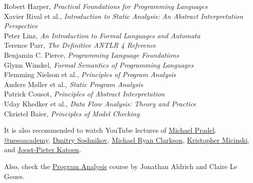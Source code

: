 \documentclass[nobrand,anonymous,nodate,nosecurity]{huawei}
\begin{document}
\begin{multicols}{2}\small\raggedright
{Robert Harper}, \emph{Practical Foundations for Programming Languages}\\[3pt]
{Xavier Rival et al.}, \emph{Introduction to Static Analysis: An Abstract Interpretation Perspective}\\[3pt]
{Peter Linz}, \emph{An Introduction to Formal Languages and Automata}\\[3pt]
{Terence Parr}, \emph{The Definitive ANTLR 4 Reference}\\[3pt]
{Benjamin C. Pierce}, \emph{Programming Language Foundations}\\[3pt]
{Glynn Winskel}, \emph{Formal Semantics of Programming Languages}\\[3pt]
{Flemming Nielson et al.}, \emph{Principles of Program Analysis}\\[3pt]
{Anders Møller et al.}, \emph{Static Program Analysis}\\[3pt]
{Patrick Cousot}, \emph{Principles of Abstract Interpretation}\\[3pt]
{Uday Khedker et al.}, \emph{Data Flow Analysis: Theory and Practice}\\[3pt]
{Christel Baier}, \emph{Principles of Model Checking}
\end{multicols}

It is also recommended to watch YouTube lectures of
	\href{https://www.youtube.com/@MichaelPradel}{Michael Pradel}.
	\href{https://www.youtube.com/@nesoacademy}{@nesoacademy},
	\href{https://www.youtube.com/@DmitrySoshnikov-education}{Dmitry Soshnikov},
	\href{https://www.youtube.com/@MichaelRyanClarkson}{Michael Ryan Clarkson},
	\href{https://www.youtube.com/@krismicinski}{Kristopher Micinski},
	and
	\href{https://www.youtube.com/@htz4523}{Joost-Pieter Katoen}.

Also, check the \href{http://www.cs.cmu.edu/~aldrich/courses/17-355-18sp/}{Program Analysis}
course by Jonathan Aldrich and Claire Le Goues.
\end{document}
